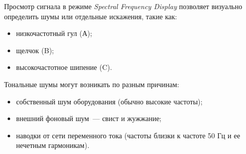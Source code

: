\documentclass{beamer}
\begin{document}
\begin{frame}
Просмотр сигнала в режиме \textit{Spectral Frequency Display} позволяет визуально определить шумы или отдельные искажения, такие как: 
\begin{itemize}
\item низкочастотный гул (А);
\item щелчок (B);
\item высокочастотное шипение (C).
\end{itemize}
\end{frame} 

\begin{frame}
Тональные шумы могут возникать по разным причинам:
\begin{itemize}
\item собственный шум оборудования (обычно высокие частоты);
\item внешний фоновый шум~--- свист и жужжание;
\item наводки от сети переменного тока (частоты близки к частоте 50 Гц и ее нечетным гармоникам).
\end{itemize}

\end{frame}
\end{document}
